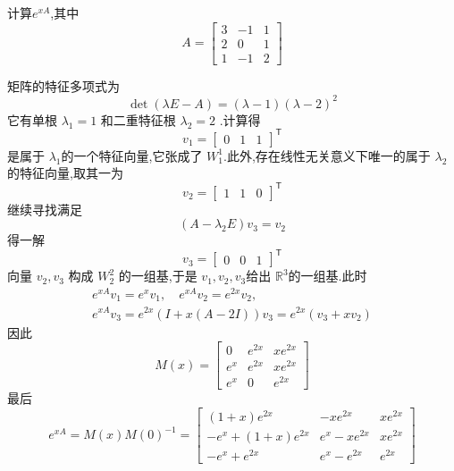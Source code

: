 \documentclass[lang=cn,12pt,color=green,fontset=none]{elegantbook}
\begin{document}
\begin{example}计算\(  e^{xA}  \),其中 \[
A=\begin{bmatrix} 
    3&-1&1\\ 
     2&0&1\\ 
      1&-1&2 
\end{bmatrix} 
\] 

\end{example}
\begin{solution}
    矩阵的特征多项式为 \[
    \det \left(  \lambda E-A \right)= \left(  \lambda -1 \right)\left(  \lambda -2 \right)^{2}   
    \]它有单根 \(   \lambda _{1}=1  \) 和二重特征根 \(   \lambda _{2}=2  \) .计算得 \[
    v_1= \begin{bmatrix} 
        0&1&1 
    \end{bmatrix}^{\mathsf{T}} 
    \]是属于 \(   \lambda _{1}  \)的一个特征向量,它张成了 \(  W_{1}^{1}  \).此外,存在线性无关意义下唯一的属于 \(   \lambda _{2}  \)的特征向量,取其一为 \[
    v_2=\begin{bmatrix} 
        1&1&0 
    \end{bmatrix} ^{\mathsf{T}}
    \]   继续寻找满足 \[
    \left( A- \lambda_{2}E \right)v_3=v_2 
    \] 得一解 \[
    v_3=\begin{bmatrix} 
        0&0&1 
    \end{bmatrix}^{\mathsf{T}} 
    \]向量 \(  v_2,v_3  \) 构成 \(  W_{2}^{2}  \) 的一组基,于是 \(  v_1,v_2,v_3  \)给出 \(  \mathbb{R} ^{3}  \)的一组基.此时 \[
    \begin{aligned}
    e^{xA}v_1=e^{x}v_1,\quad e^{xA}v_2=e^{2x}v_2,\\ 
     e^{xA}v_3=e^{2x}\left( I+ x\left( A-2I \right)  \right)v_3=e^{2x}\left( v_3+ xv_{2} \right)   
    \end{aligned}
    \]  因此 \[
    M\left( x \right)=\begin{bmatrix} 
        0&e^{2x}& xe^{2x}\\ 
         e^{x}&e^{2x}&xe^{2x}\\ 
          e^{x}&0&e^{2x} 
    \end{bmatrix}  
    \]最后 \[
        e^{xA}=M(x)M(0)^{-1}=\begin{bmatrix}(1+x)e^{2x}&-xe^{2x}&xe^{2x}\\-e^x+(1+x)e^{2x}&e^x-xe^{2x}&xe^{2x}\\-e^x+e^{2x}&e^x-e^{2x}&e^{2x}\end{bmatrix}
    \]
    
\end{solution}
\end{document}
